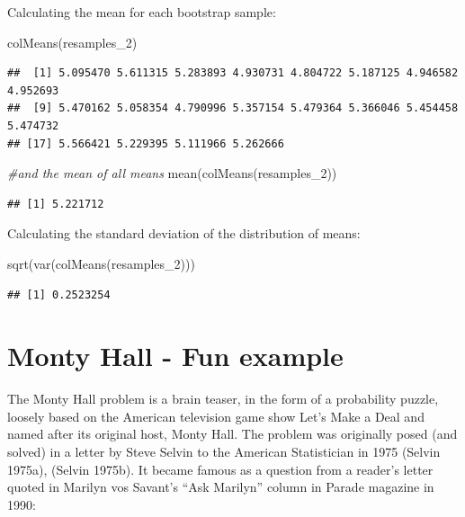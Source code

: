 \documentclass[
]{book}
\newenvironment{Shaded}{\begin{snugshade}}{\end{snugshade}}
\newcommand{\CommentTok}[1]{\textcolor[rgb]{0.56,0.35,0.01}{\textit{#1}}}
\newcommand{\FunctionTok}[1]{\textcolor[rgb]{0.00,0.00,0.00}{#1}}
\newcommand{\NormalTok}[1]{#1}
\theoremstyle{definition}
\theoremstyle{definition}
\theoremstyle{definition}
\theoremstyle{definition}
\theoremstyle{remark}
\begin{document}
Calculating the mean for each bootstrap sample:

\begin{Shaded}
\begin{Highlighting}[]
\FunctionTok{colMeans}\NormalTok{(resamples\_2)}
\end{Highlighting}
\end{Shaded}

\begin{verbatim}
##  [1] 5.095470 5.611315 5.283893 4.930731 4.804722 5.187125 4.946582 4.952693
##  [9] 5.470162 5.058354 4.790996 5.357154 5.479364 5.366046 5.454458 5.474732
## [17] 5.566421 5.229395 5.111966 5.262666
\end{verbatim}

\begin{Shaded}
\begin{Highlighting}[]
\CommentTok{\#and the mean of all means}
\FunctionTok{mean}\NormalTok{(}\FunctionTok{colMeans}\NormalTok{(resamples\_2))}
\end{Highlighting}
\end{Shaded}

\begin{verbatim}
## [1] 5.221712
\end{verbatim}

Calculating the standard deviation of the distribution of means:

\begin{Shaded}
\begin{Highlighting}[]
\FunctionTok{sqrt}\NormalTok{(}\FunctionTok{var}\NormalTok{(}\FunctionTok{colMeans}\NormalTok{(resamples\_2)))}
\end{Highlighting}
\end{Shaded}

\begin{verbatim}
## [1] 0.2523254
\end{verbatim}

\hypertarget{monty-hall---fun-example}{%
\section{Monty Hall - Fun example}\label{monty-hall---fun-example}}

The Monty Hall problem is a brain teaser, in the form of a probability puzzle, loosely based on the American television game show Let's Make a Deal and named after its original host, Monty Hall. The problem was originally posed (and solved) in a letter by Steve Selvin to the American Statistician in 1975 (Selvin 1975a), (Selvin 1975b). It became famous as a question from a reader's letter quoted in Marilyn vos Savant's ``Ask Marilyn'' column in Parade magazine in 1990:
\end{document}
